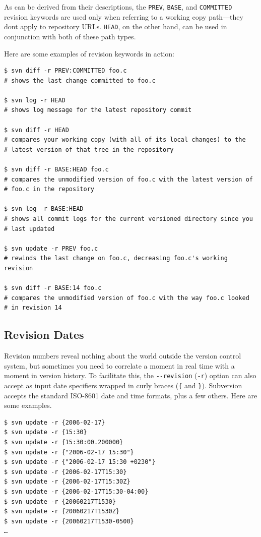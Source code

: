As can be derived from their descriptions, the \texttt{PREV},
\texttt{BASE}, and \texttt{COMMITTED} revision keywords are used only
when referring to a working copy path---they don\textquotesingle t apply
to repository URLs. \texttt{HEAD}, on the other hand, can be used in
conjunction with both of these path types.

Here are some examples of revision keywords in action:

\begin{verbatim}
$ svn diff -r PREV:COMMITTED foo.c
# shows the last change committed to foo.c

$ svn log -r HEAD
# shows log message for the latest repository commit

$ svn diff -r HEAD
# compares your working copy (with all of its local changes) to the
# latest version of that tree in the repository

$ svn diff -r BASE:HEAD foo.c
# compares the unmodified version of foo.c with the latest version of
# foo.c in the repository

$ svn log -r BASE:HEAD
# shows all commit logs for the current versioned directory since you
# last updated

$ svn update -r PREV foo.c
# rewinds the last change on foo.c, decreasing foo.c's working revision

$ svn diff -r BASE:14 foo.c
# compares the unmodified version of foo.c with the way foo.c looked
# in revision 14
\end{verbatim}

\subsection{Revision Dates}\label{svn.tour.revs.dates}

Revision numbers reveal nothing about the world outside the version
control system, but sometimes you need to correlate a moment in real
time with a moment in version history. To facilitate this, the
\texttt{-\/-revision} (\texttt{-r}) option can also accept as input date
specifiers wrapped in curly braces (\texttt{\{} and \texttt{\}}).
Subversion accepts the standard ISO-8601 date and time formats, plus a
few others. Here are some examples.

\begin{verbatim}
$ svn update -r {2006-02-17}
$ svn update -r {15:30}
$ svn update -r {15:30:00.200000}
$ svn update -r {"2006-02-17 15:30"}
$ svn update -r {"2006-02-17 15:30 +0230"}
$ svn update -r {2006-02-17T15:30}
$ svn update -r {2006-02-17T15:30Z}
$ svn update -r {2006-02-17T15:30-04:00}
$ svn update -r {20060217T1530}
$ svn update -r {20060217T1530Z}
$ svn update -r {20060217T1530-0500}
…
\end{verbatim}

